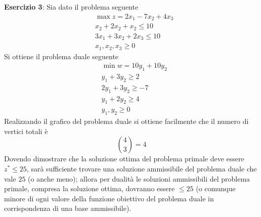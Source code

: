 \documentclass[a4paper]{extarticle}
\begin{document}
\vspace{1em}
\noindent
\textbf{Esercizio 3}: Sia dato il problema seguente
\begin{align*}
    &\max z = 2x_1 - 7x_2 + 4x_3\\
    & x_2 + 2x_2 + x_2 \leq 10\\
    & 3x_1 + 3x_2 + 2x_3 \leq 10\\
    & x_1,x_2,x_3 \geq 0
\end{align*}
Si ottiene il problema duale seguente
\begin{align*}
    &\min w = 10y_1 + 10 y_2\\
    & y_1 + 3y_2 \geq 2\\
    & 2y_1 + 3y_2 \geq -7\\
    & y_1 + 2y_2 \geq 4\\
    & y_1,y_2 \geq 0
\end{align*}
Realizzando il grafico del problema duale si ottiene facilmente che il numero di vertici totali è
\[\binom{4}{3} = 4\]
Dovendo dimostrare che la soluzione ottima del problema primale deve essere $z^* \leq 25$, sarà sufficiente trovare una soluzione ammissibile del problema duale che vale $25$ (o anche meno); allora per dualità le soluzioni ammissibili del problema primale, compresa la soluzione ottima, dovranno essere $\leq 25$ (o comunque minore di ogni valore della funzione obiettivo del problema duale in corrispondenza di una base ammissibile).
\end{document}
